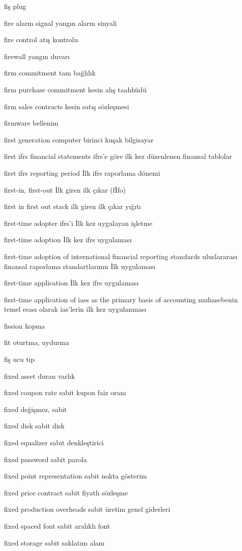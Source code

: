 \documentclass[12pt,fleqn]{article}\usepackage{../../common}
\begin{document}
fiş plug

fire alarm signal yangın alarm sinyali

fire control atış kontrolu

firewall yangın duvarı

firm commitment tam bağlılık

firm purchase commitment kesin alış taahhüdü

firm sales contracts kesin satış sözleşmesi

firmware bellenim

first generation computer birinci kuşak bilgisayar

first ifrs financial statements ifrs'e göre ilk kez düzenlenen finansal tablolar

first ifrs reporting period İlk ifrs raporlama dönemi

first-in, first-out İlk giren ilk çıkar (fİfo)

first in first out stack ilk giren ilk çıkar yığıtı

first-time adopter ifrs'i İlk kez uygulayan işletme

first-time adoption İlk kez ifrs uygulaması

first-time adoption of international financial reporting standards uluslararası finansal raporlama standartlarının İlk uygulaması

first-time application İlk kez ifrs uygulaması

first-time application of iass as the primary basis of accounting muhasebenin temel esası olarak ias'lerin ilk kez uygulanması

fission kopma

fit oturtma, uydurma

fiş ucu tip

fixed asset duran varlık

fixed coupon rate sabit kupon faiz oranı

fixed değişmez, sabit

fixed disk sabit disk

fixed equalizer sabit denkleştirici

fixed password sabit parola

fixed point representation sabit nokta gösterim

fixed price contract sabit fiyatlı sözleşme

fixed production overheads sabit üretim genel giderleri

fixed spaced font sabit aralıklı font

fixed storage sabit saklatım alanı
\end{document}
